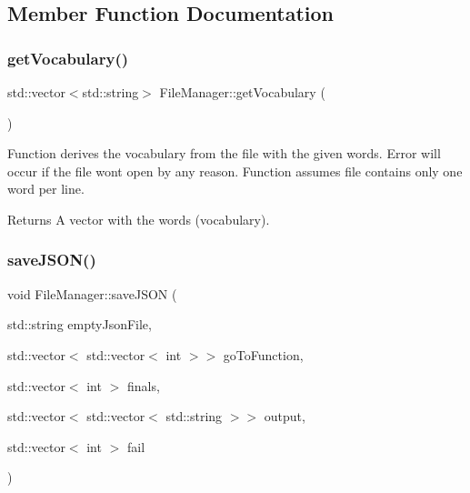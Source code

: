 \subsection{Member Function Documentation}
\mbox{\label{classFileManager_ac9b807a2698e538246c349023e7b07d1}} 
\subsubsection{\texorpdfstring{get\+Vocabulary()}{getVocabulary()}}
{\footnotesize\ttfamily std\+::vector$<$std\+::string$>$ File\+Manager\+::get\+Vocabulary (\begin{DoxyParamCaption}{ }\end{DoxyParamCaption})\hspace{0.3cm}{\ttfamily [inline]}}

Function derives the vocabulary from the file with the given words. Error will occur if the file won\textquotesingle{}t open by any reason. Function assumes file contains only one word per line.

\begin{DoxyReturn}{Returns}
A vector with the words (vocabulary). 
\end{DoxyReturn}
\mbox{\label{classFileManager_aa3fd9c8bba7be2102df0ddaefa57f65f}} 
\subsubsection{\texorpdfstring{save\+J\+S\+O\+N()}{saveJSON()}}
{\footnotesize\ttfamily void File\+Manager\+::save\+J\+S\+ON (\begin{DoxyParamCaption}\item[{std\+::string}]{empty\+Json\+File,  }\item[{std\+::vector$<$ std\+::vector$<$ int $>$$>$}]{go\+To\+Function,  }\item[{std\+::vector$<$ int $>$}]{finals,  }\item[{std\+::vector$<$ std\+::vector$<$ std\+::string $>$$>$}]{output,  }\item[{std\+::vector$<$ int $>$}]{fail }\end{DoxyParamCaption})\hspace{0.3cm}{\ttfamily [inline]}}

